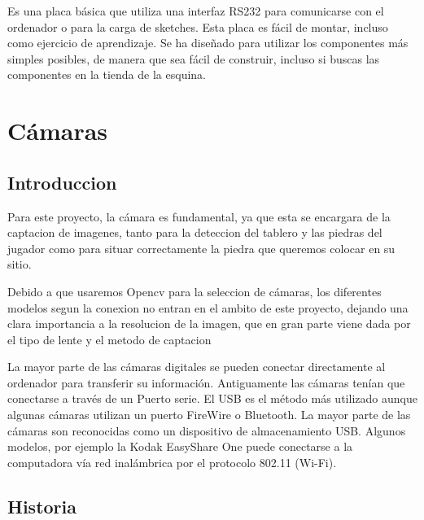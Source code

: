 \documentclass[12pt,a4paper]{report}
\begin{document}
Es una placa básica que utiliza una interfaz RS232 para comunicarse con el
ordenador o para la carga de sketches. Esta placa es fácil de montar, incluso
como ejercicio de aprendizaje. Se ha diseñado para utilizar los componentes más
simples posibles, de manera que sea fácil de construir, incluso si buscas las
componentes en la tienda de la esquina.







\section{Cámaras}
\subsection{Introduccion}

Para este proyecto, la cámara es fundamental, ya que esta se encargara de la
captacion de imagenes, tanto para la deteccion del tablero y las piedras del
jugador como para situar correctamente la piedra que queremos colocar en su
sitio.

Debido a que usaremos Opencv para la seleccion de cámaras, los diferentes
modelos segun la conexion no entran en el ambito de este proyecto, dejando una
clara importancia a la resolucion de la imagen, que en gran parte viene dada por
el tipo de lente y el metodo de captacion 

La mayor parte de las cámaras digitales se pueden conectar directamente al
ordenador para transferir su información. Antiguamente las cámaras tenían que
conectarse a través de un Puerto serie. El USB es el método más utilizado aunque
algunas cámaras utilizan un puerto FireWire o Bluetooth. La mayor parte de las
cámaras son reconocidas como un dispositivo de almacenamiento USB. Algunos
modelos, por ejemplo la Kodak EasyShare One puede conectarse a la computadora
vía red inalámbrica por el protocolo 802.11 (Wi-Fi).

\subsection{Historia}
\end{document}
